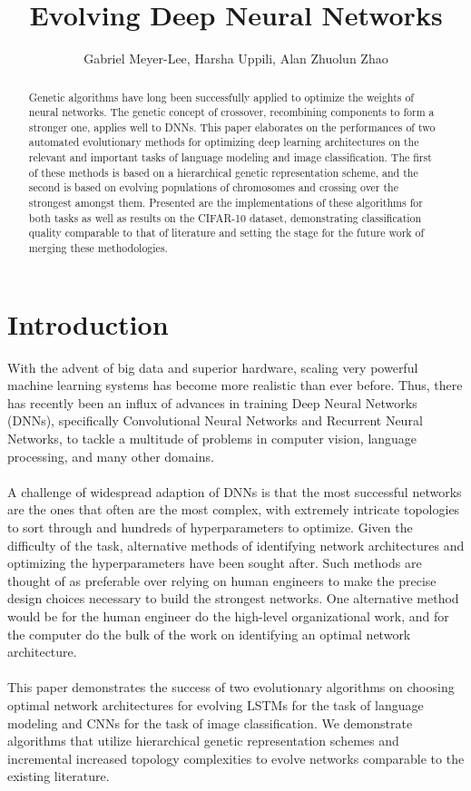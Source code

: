 \documentclass[11pt]{article}
\title{Evolving Deep Neural Networks}
\author{Gabriel Meyer-Lee, Harsha Uppili, Alan Zhuolun Zhao} %
\date{} %
\begin{document}
\maketitle

\begin{abstract}
Genetic algorithms have long been successfully applied to optimize the weights of neural networks. The genetic concept of crossover, recombining components to form a stronger one, applies well to DNNs. This paper elaborates on the performances of two automated  evolutionary methods for optimizing deep learning architectures on the relevant and important tasks of language modeling and image classification. The first of these methods is based on a hierarchical genetic representation scheme, and the second is based on evolving populations of chromosomes and crossing over the strongest amongst them. Presented are the implementations of these algorithms for both tasks as well as results on the CIFAR-10 dataset, demonstrating classification quality comparable to that of literature and setting the stage for the future work of merging these methodologies. 
\end{abstract}



\section{Introduction}

	With the advent of big data and superior hardware, scaling very powerful machine learning systems has become more realistic than ever before. Thus, there has recently been an influx of advances in training Deep Neural Networks (DNNs), specifically Convolutional Neural Networks and Recurrent Neural Networks, to tackle a multitude of problems in computer vision, language processing, and many other domains.\\ 
   \\ A challenge of widespread adaption of DNNs is that the most successful networks are the ones that often are the most complex, with extremely intricate topologies to sort through and hundreds of hyperparameters to optimize. Given the difficulty of the task, alternative methods of identifying network architectures and optimizing the hyperparameters have been sought after. Such methods are thought of as preferable over relying on human engineers to make the precise design choices necessary to build the strongest networks. One alternative method would be for the human engineer do the high-level organizational work, and for the computer do the bulk of the work on identifying an optimal network architecture. \\
    \\This paper demonstrates the success of two evolutionary algorithms on choosing optimal network architectures for evolving LSTMs for the task of language modeling and CNNs for the task of image classification. We demonstrate algorithms that utilize hierarchical genetic representation schemes and incremental increased topology complexities to evolve networks comparable to the existing literature. 
    
\end{document}
